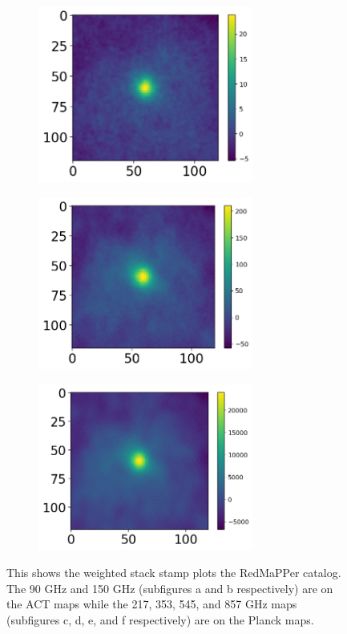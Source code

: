 \documentclass{princeton_astro_thesis}
\begin{document}
\begin{figure}[ht]
\begin{subfigure}[b]{0.5\linewidth}
    \caption{\label{fig:fig3}}
  \end{subfigure}
 \begin{subfigure}[b]{0.1\linewidth}
    \centering\includegraphics[width=200pt]{../f353_redmapper_wstack.png}
    \caption{\label{fig:fig3}}
  \end{subfigure}
 \begin{subfigure}[b]{0.5\linewidth}
    \centering\includegraphics[width=200pt]{../f545_redmapper_wstack.png}
    \caption{\label{fig:fig3}}
  \end{subfigure}
   \begin{subfigure}[b]{0.1\linewidth}
    \centering\includegraphics[width=200pt]{../f857_redmapper_wstack.png}
    \caption{\label{fig:fig3}}
  \end{subfigure}
  \caption{This shows the weighted stack stamp plots the RedMaPPer catalog. The 90 GHz and 150 GHz (subfigures a and b respectively) are on the ACT maps while the 217, 353, 545, and 857 GHz maps (subfigures c, d, e, and f respectively) are on the Planck maps. }
\end{figure}
\end{document}
